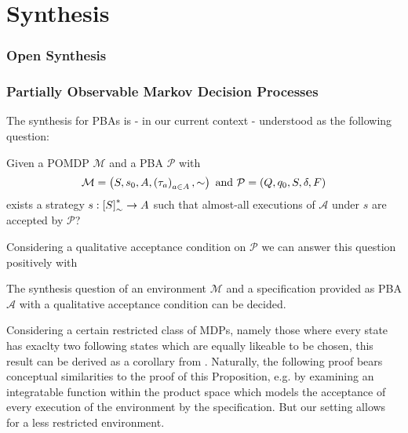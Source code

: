 \chapter{Synthesis}
\label{chapter:synthesis}
\subsection{Open Synthesis}

\subsection{Partially Observable Markov Decision Processes}

The synthesis for \acp{PBA} is - in our current context - understood as the
following question:
\begin{definition}
  Given a \ac{POMDP} $\mathcal{M}$ and a \ac{PBA} $\mathcal{P}$ with
  \begin{equation*}
    \mathcal{M} = \left(S, s_{0}, A, \left(\tau_{a}\right)_{a\in A}, \sim\right)
  \text{ and }
    \mathcal{P} = \left(Q, q_{0}, S, \delta, F\right)
  \end{equation*}
  exists a strategy $s:\left[S\right]_{\sim}^{*}\rightarrow A$ such that 
  almost-all executions of $\mathcal{A}$ under $s$ are accepted by 
  $\mathcal{P}$?
  \label{def:synthesis}
\end{definition}
Considering a qualitative acceptance condition on $\mathcal{P}$ we can answer
this question positively with
\begin{theorem}
  The synthesis question of an environment $\mathcal{M}$ and a specification
  provided as \ac{PBA} $\mathcal{A}$ with a qualitative acceptance condition
  can be decided.
  \label{thm:synthesis}
\end{theorem}
Considering a certain restricted class of \acp{MDP}, namely those where every
state has exaclty two following states which are equally likeable to be chosen,
this result can be derived as a corollary from
\cite[Proposition 43]{RandAutoInfTrees}. Naturally, the following proof bears
conceptual similarities to the proof of this Proposition, e.g. by examining an
integratable function within the product space which models the acceptance of
every execution of the environment by the specification. But our setting allows
for a less restricted environment.
